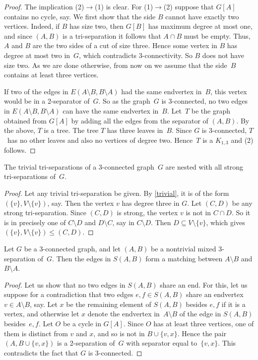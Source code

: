 \documentclass{aic}
\newcommand{\se}{\subseteq}
\theoremstyle{plain}
\theoremstyle{definition}
\theoremstyle{plain}
\theoremstyle{plain}
\newcommand{\sm}{\setminus}
\renewcommand{\le}{\leqslant}
\begin{document}
\begin{proof}
The implication (2)$\to$(1) is clear.
For (1)$\to$(2) suppose that $G[A]$ contains no cycle, say.
We first show that the side $B$ cannot have exactly two vertices.
Indeed, if $B$ has size two, then $G[B]$ has maximum degree at most one, and since $(A,B)$ is a tri-separation it follows that $A\cap B$ must be empty.
Thus, $A$ and $B$ are the two sides of a cut of size three.
Hence some vertex in $B$ has degree at most two in~$G$, which contradicts 3-connectivity. 
So $B$ does not have size two.
As we are done otherwise, from now on we assume that the side~$B$ contains at least three vertices. 

If two of the edges in $E(A\sm B, B\sm A)$ had the same 
endvertex in~$B$, this vertex would be in a 2-separator of~$G$. 
So as the graph~$G$ is 3-connected, no two edges in $E(A\sm B, B\sm A)$ can have the same 
endvertex in~$B$. 
Let~$T$ be the graph obtained from $G[A]$ by adding all the edges from the separator of $(A,B)$.
By the above, $T$ is a tree. 
The tree $T$ has three leaves in~$B$.
Since $G$ is 3-connected, $T$~has no other leaves and also no vertices of degree two.
Hence~$T$ is a $K_{1,3}$ and (2) follows.
\end{proof}

\begin{cor}\label{trivial_is_nested}
The trivial tri-separations of a 3-connected graph~$G$ are nested with all strong tri-separations of~$G$.
\end{cor}

\begin{proof}
Let any trivial tri-separation be given.
By \autoref{trivial}, it is of the form $(\{v\},V\sm\{v\})$, say. 
Then the vertex $v$ has degree three in $G$. Let 
$(C,D)$ be any strong tri-separation. 
Since $(C,D)$ is strong, the vertex $v$ is not in 
$C\cap D$. So it is in precisely one of $C\sm D$ and $D\sm C$, say in $C\sm D$.
Then $D\se V\sm\{v\}$, which gives $(\{v\},V\sm\{v\})\le (C,D)$.  
\end{proof}

\begin{lem}\label{independentEdges}
Let $G$ be a 3-connected graph, and let $(A,B)$ be a nontrivial mixed 3-separation of~$G$.
Then the edges in $S(A,B)$ form a matching between $A\sm B$ and $B\sm A$.
\end{lem}
\begin{proof}
Let us show that no two edges in $S(A,B)$ share an end.
For this, let us suppose for a contradiction that two edges $e,f\in S(A,B)$ share an endvertex $v\in A\sm B$, say.
Let $x$ be the remaining element of $S(A,B)$ besides $e,f$ if it is a vertex, and otherwise let $x$ denote the endvertex in~$A\sm B$ of the edge in $S(A,B)$ besides~$e,f$.
Let $O$ be a cycle in $G[A]$.
Since $O$ has at least three vertices, one of them is distinct from $v$ and $x$, and so is not in $B\cup\{v,x\}$.
Hence the pair $(A,B\cup\{v,x\})$ is a 2-separation of~$G$ with separator equal to~$\{v,x\}$.
This contradicts the fact that $G$ is 3-connected.
\end{proof}
\end{document}
